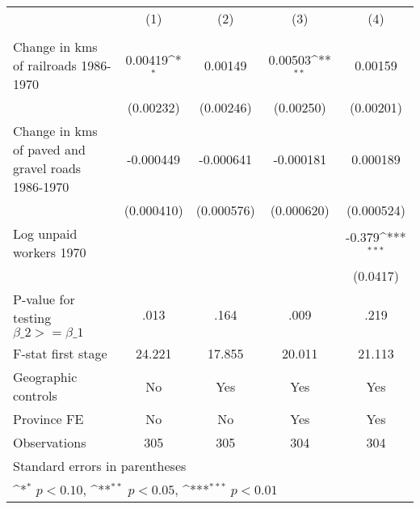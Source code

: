 {
\def\sym#1{\ifmmode^{#1}\else\(^{#1}\)\fi}
\begin{tabular}{l*{4}{c}}
\hline\hline
                &\multicolumn{1}{c}{(1)}&\multicolumn{1}{c}{(2)}&\multicolumn{1}{c}{(3)}&\multicolumn{1}{c}{(4)}\\
                &\multicolumn{1}{c}{}&\multicolumn{1}{c}{}&\multicolumn{1}{c}{}&\multicolumn{1}{c}{}\\
\hline
Change in kms of railroads 1986-1970&  0.00419\sym{*}  &  0.00149         &  0.00503\sym{**} &  0.00159         \\
                &(0.00232)         &(0.00246)         &(0.00250)         &(0.00201)         \\
[1em]
Change in kms of paved and gravel roads 1986-1970&-0.000449         &-0.000641         &-0.000181         & 0.000189         \\
                &(0.000410)         &(0.000576)         &(0.000620)         &(0.000524)         \\
[1em]
Log unpaid workers 1970&                  &                  &                  &   -0.379\sym{***}\\
                &                  &                  &                  & (0.0417)         \\
\hline
P-value for testing $\beta\_{2} >= \beta\_{1}$&     .013         &     .164         &     .009         &     .219         \\
F-stat first stage&   24.221         &   17.855         &   20.011         &   21.113         \\
Geographic controls&       No         &      Yes         &      Yes         &      Yes         \\
Province FE     &       No         &       No         &      Yes         &      Yes         \\
Observations    &      305         &      305         &      304         &      304         \\
\hline\hline
\multicolumn{5}{l}{\footnotesize Standard errors in parentheses}\\
\multicolumn{5}{l}{\footnotesize \sym{*} \(p<0.10\), \sym{**} \(p<0.05\), \sym{***} \(p<0.01\)}\\
\end{tabular}
}
